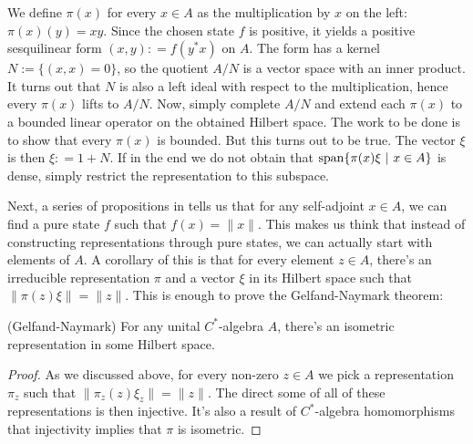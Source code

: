 We define $\pi(x)$ for every $x \in A$ as the multiplication by $x$ on the left: $\pi(x)(y) = xy$. Since the chosen state $f$ is positive, it yields a positive sesquilinear form $(x,y) : = f(y^*x)$ on $A$. The form has a kernel $N:= \{(x,x) = 0\}$, so the quotient $A/N$ is a vector space with an inner product. It turns out that $N$ is also a left ideal with respect to the multiplication, hence every $\pi(x)$ lifts to $A/N$. Now, simply complete $A/N$ and extend each $\pi(x)$ to a bounded linear operator on the obtained Hilbert space. The work to be done is to show that every $\pi(x)$ is bounded. But this turns out to be true. The vector $\xi$ is then $\xi : = 1 +N$. If in the end we do not obtain that $\operatorname{span} \{\pi(x)\xi \ | \ x\in A\}$ is dense, simply restrict the representation to this subspace.

Next, a series of propositions in \cite{arveson} tells us that for any self-adjoint $x \in A$, we can find a pure state $f$ such that $f(x) = \|x\|$. This makes us think that instead of constructing representations through pure states, we can actually start with elements of $A$. A corollary of this is that for every element $z \in A$, there's an irreducible representation $\pi$ and a vector $\xi$ in its Hilbert space such that $\|\pi(z)\xi\| = \|z\|$. This is enough to prove the Gelfand-Naymark theorem:
\begin{theorem}
(Gelfand-Naymark) For any unital $C^*$-algebra $A$, there's an isometric representation in some Hilbert space.
\end{theorem}
\begin{proof}
As we discussed above, for every non-zero $z \in A$ we pick a representation $\pi_z$ such that $\|\pi_z(z)\xi_z\| = \|z\|$. The direct some of all of these representations is then injective. It's also a result of $C^*$-algebra homomorphisms that injectivity implies that $\pi$ is isometric.
\end{proof}

